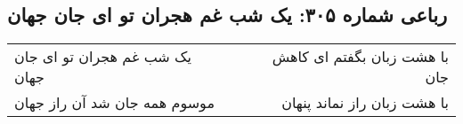 \begin{center}
\section*{رباعی شماره ۳۰۵: یک شب غم هجران تو ای جان جهان}
\label{sec:sh305}
\begin{longtable}{l p{0.5cm} r}
یک شب غم هجران تو ای جان جهان
&&
با هشت زبان بگفتم ای کاهش جان
\\
موسوم همه جان شد آن راز جهان
&&
با هشت زبان راز نماند پنهان
\\
\end{longtable}
\end{center}
